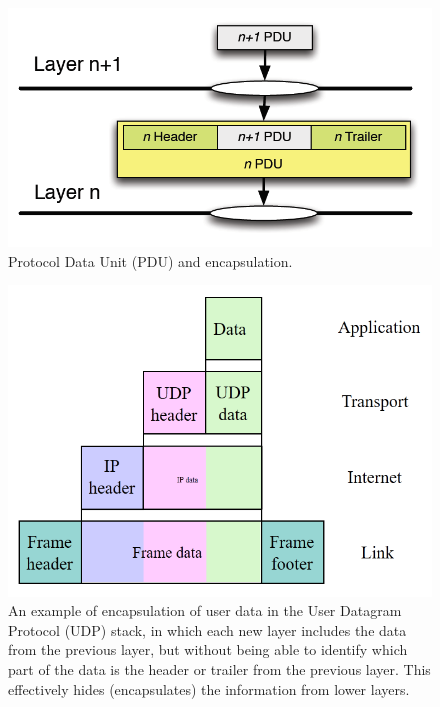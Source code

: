 \begin{figure}[H]
    \centering
    \includegraphics[scale=0.5]{img/pdu.png}
    \decoRule
    \caption{Protocol Data Unit (PDU) and encapsulation.}
    \label{fig:pdu}
\end{figure}

\begin{figure}[H]
    \centering
    \includegraphics[scale=0.5]{img/udp_pdu.png}
    \decoRule
    \caption{An example of encapsulation of user data in the User Datagram Protocol (UDP) stack, in which each new layer includes the data from the previous layer, but without being able to identify which part of the data is the header or trailer from the previous layer. This effectively hides (encapsulates) the information from lower layers.}
    \label{fig:udp_pdu}
\end{figure}

